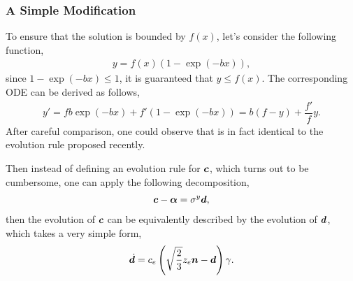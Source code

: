 \subsubsection{A Simple Modification}
To ensure that the solution is bounded by $f(x)$, let's consider the following function,
\begin{gather}
    y=f(x)\left(1-\exp\left(-bx\right)\right),
\end{gather}
since $1-\exp\left(-bx\right)\leqslant1$, it is guaranteed that $y\leqslant{}f(x)$.
The corresponding ODE can be derived as follows,
\begin{gather}\label{eq:strict_bound}
    y'=fb\exp\left(-bx\right)+f'\left(1-\exp\left(-bx\right)\right)=b\left(f-y\right)+\dfrac{f'}{f}y.
\end{gather}
After careful comparison, one could observe that  is in fact identical to the evolution rule proposed recently.

Then instead of defining an evolution rule for $\bm{c}$, which turns out to be cumbersome, one can apply the following decomposition,
\begin{gather}
    \bm{c}-\bm{\alpha}=\sigma^y\bm{d},
\end{gather}
then the evolution of $\bm{c}$ can be equivalently described by the evolution of $\bm{d}$, which takes a very simple form,
\begin{gather}
    \dot{\bm{d}}=c_e\left(\sqrt{\dfrac{2}{3}}z_e\bm{n}-\bm{d}\right)\gamma.
\end{gather}